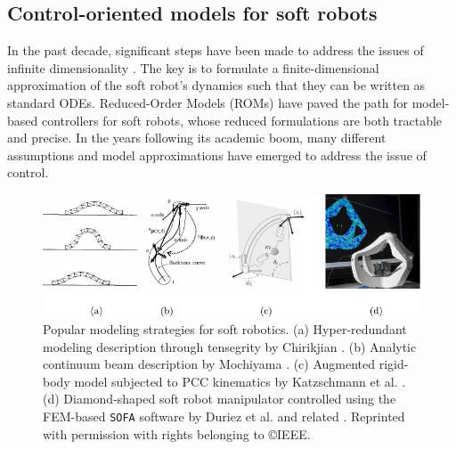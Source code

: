 \subsection{Control-oriented models for soft robots}
In the past decade, significant steps have been made to address the issues of infinite dimensionality \cite{DellaSantina2021}. The key is to formulate a finite-dimensional approximation of the soft robot's dynamics such that they can be written as standard ODEs. Reduced-Order Models (ROMs) have paved the path for model-based controllers for soft robots, whose reduced formulations are both tractable and precise. In the years following its academic boom, many different assumptions and model approximations have emerged to address the issue of control.
%
\begin{figure}[!t]
  \vspace{-2mm}
  \centering
  \includegraphics*[width=1.0\textwidth]{./pdf/thesis-figure-1-4v2.pdf}
  \caption{\small Popular modeling strategies for soft robotics. (a) Hyper-redundant modeling description through tensegrity by Chirikjian \cite{Chirikjian1992,Chirikjian1991crawler}. (b) Analytic continuum beam description by Mochiyama \cite{Mochiyama1999,Mochiyama2003}. (c) Augmented rigid-body model subjected to PCC kinematics by Katzschmann et al. \cite{Katzschmann2019}. (d) Diamond-shaped soft robot manipulator controlled using the FEM-based \texttt{SOFA} software by Duriez et al. \cite{Duriez2013} and related \cite{Coevoet2017,Goury2018}. Reprinted with permission with rights belonging to \copyright IEEE.%
  }
  \label{fig:C0:modeltypes}
  \vspace{-5mm}
\end{figure}
